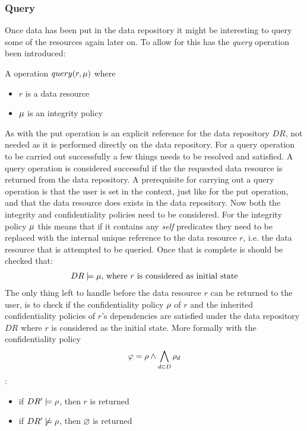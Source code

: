 \subsubsection{Query}\label{sec:query}
Once data has been put in the data repository it might be interesting to query some of the resources again later on. To allow for this has the \emph{query} operation been introduced:
\begin{definition}
A operation $query(r, \mu)$ where
\begin{itemize}
  \item $r$ is a data resource
  \item $\mu$ is an integrity policy
\end{itemize}
\end{definition}
As with the put operation is an explicit reference for the data repository $DR$, not needed as it is performed directly on the data repository. For a query operation to be carried out successfully a few things needs to be resolved and satisfied. A query operation is considered successful if the the requested data resource is returned from the data repository. A prerequisite for carrying out a query operation is that the user is set in the context, just like for the put operation, and that the data resource does exists in the data repository. Now both the integrity and confidentiality policies need to be considered. For the integrity policy $\mu$ this means that if it contains any \emph{self} predicates they need to be replaced with the internal unique reference to the data resource $r$, i.e. the data resource that is attempted to be queried. Once that is complete is should be checked that:
\begin{align*}
    DR \models \mu \text{, where $r$ is considered as initial state}
\end{align*}
The only thing left to handle before the data resource $r$ can be returned to the user, is to check if the confidentiality policy $\rho$ of $r$ and the inherited confidentiality policies of $r$'s dependencies are satisfied under the data repository $DR$ where $r$ is considered as the initial state. More formally with the confidentiality policy $$\varphi = \rho \land \bigwedge\limits_{d \in D} \rho_d$$:

\begin{itemize}
    \item if $DR' \models \rho$, then $r$ is returned
    \item if $DR' \not\models \rho$, then $\varnothing$ is returned
\end{itemize}

